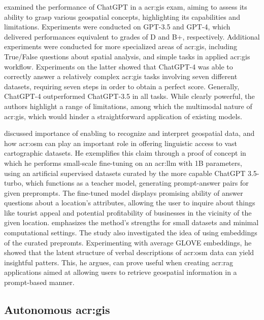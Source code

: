 \cite{mooneyUnderstandingGeospatialSkills2023} examined the performance of ChatGPT in a \acrfull{acr:gis} exam, aiming to assess its ability to grasp various geospatial concepts, highlighting its capabilities and limitations. Experiments were conducted on GPT-3.5 and GPT-4, which delivered performances equivalent to grades of D and B+, respectively. Additional experiments were conducted for more specialized areas of \acrshort{acr:gis}, including True/False questions about spatial analysis, and simple tasks in applied \acrshort{acr:gis} workflow. Experiments on the latter showed that ChatGPT-4 was able to correctly answer a relatively complex \acrshort{acr:gis} tasks involving seven different datasets, requiring seven steps in order to obtain a perfect score. Generally, ChatGPT-4 outperformed ChatGPT-3.5 in all tasks. While clearly powerful, the authors highlight a range of limitations, among which the multimodal nature of \acrshort{acr:gis}, which would hinder a straightforward application of existing models.

\cite{unluChatmapLargeLanguage2023} discussed importance of enabling  to recognize and interpret geospatial data, and how \gls{acr:osm} can play an important role in offering  linguistic access to vast cartographic datasets. He exemplifies this claim through a proof of concept in which he performs small-scale fine-tuning on an \acrshort{acr:llm} with 1B parameters, using an artificial supervised datasets curated by the more capable ChatGPT 3.5-turbo, which functions as a teacher model, generating prompt-answer pairs for given preprompts. The fine-tuned model displays promising ability of answer questions about a location's attributes, allowing the user to inquire about things like tourist appeal and potential profitability of businesses in the vicinity of the given location. \citeauthor{unluChatmapLargeLanguage2023} emphasizes the method's strengths for small datasets and minimal computational settings. The study also investigated the idea of using embeddings of the curated prepromts. Experimenting with average GLOVE embeddings, he showed that the latent structure of verbal descriptions of \gls{acr:osm} data can yield insightful patters. This, he argues, can prove useful when creating \acrfull{acr:rag} applications aimed at allowing users to retrieve geospatial information in a prompt-based manner.

\subsection[]{Autonomous \acrshort{acr:gis}}

